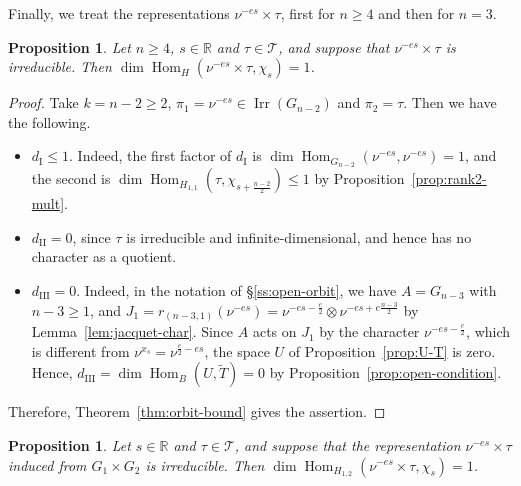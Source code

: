\documentclass[11pt]{amsart}
\numberwithin{equation}{section}
\theoremstyle{plain}
\newtheorem{proposition}[theorem]{Proposition}
\theoremstyle{definition}
\theoremstyle{remark}
\newcommand{\R}{\mathbb{R}}
\newcommand{\T}{\mathcal{T}}
\DeclareMathOperator{\Hom}{Hom}
\DeclareMathOperator{\Irr}{Irr}
\newcommand{\dI}{d_{\mathrm{I}}}
\newcommand{\dII}{d_{\mathrm{II}}}
\newcommand{\dIII}{d_{\mathrm{III}}}
\begin{document}
Finally, we treat the representations $\nu^{-es}\times\tau$, first for $n\ge4$ and then for $n=3$.

\begin{proposition}\label{prop:mult-c-n4}
	Let $n\ge4$, $s\in\R$ and $\tau\in\T$, and suppose that $\nu^{-es}\times\tau$ is irreducible. Then $\dim\Hom_H(\nu^{-es}\times\tau,\chi_s)=1$.
\end{proposition}

\begin{proof}
	Take $k=n-2\ge2$, $\pi_1=\nu^{-es}\in\Irr(G_{n-2})$ and $\pi_2=\tau$. Then we have the following.
	\begin{itemize}
		\item $\dI\le1$. Indeed, the first factor of $\dI$ is $\dim\Hom_{G_{n-2}}(\nu^{-es},\nu^{-es})=1$, and the second is $\dim\Hom_{H_{1,1}}(\tau,\chi_{s+\frac{n-2}2})\le1$ by Proposition~\ref{prop:rank2-mult}.
		\item $\dII=0$, since $\tau$ is irreducible and infinite-dimensional, and hence has no character as a quotient.
		\item $\dIII=0$. Indeed, in the notation of \S\ref{ss:open-orbit}, we have $A=G_{n-3}$ with $n-3\ge1$, and $J_1=r_{(n-3,1)}(\nu^{-es})=\nu^{-es-\frac e2}\otimes\nu^{-es+e\frac{n-3}2}$ by Lemma~\ref{lem:jacquet-char}. Since $A$ acts on $J_1$ by the character $\nu^{-es-\frac e2}$, which is different from $\nu^{x_s}=\nu^{\frac e2-es}$, the space $U$ of Proposition~\ref{prop:U-T} is zero. Hence, $\dIII=\dim\Hom_B(U,\widetilde T)=0$ by Proposition~\ref{prop:open-condition}.
	\end{itemize}
	Therefore, Theorem~\ref{thm:orbit-bound} gives the assertion.
\end{proof}

\begin{proposition}\label{prop:mult-c-n3}
	Let $s\in\R$ and $\tau\in\T$, and suppose that the representation $\nu^{-es}\times\tau$ induced from $G_1\times G_2$ is irreducible. Then $\dim\Hom_{H_{1,2}}(\nu^{-es}\times\tau,\chi_s)=1$.
\end{proposition}
\end{document}
